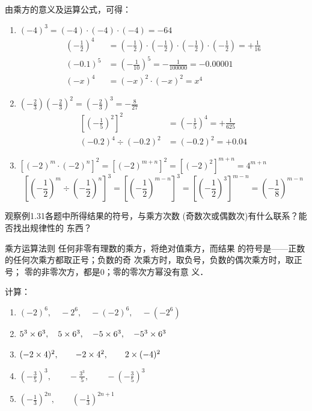 \begin{solution}
	由乘方的意义及运算公式，可得：
	\begin{enumerate}
		\item $(-4)^3=(-4)\cdot (-4)\cdot (-4)=-64$
		\[\begin{split}
		\left(-\frac{1}{2}\right)^4&=\left(-\frac{1}{2}\right)\cdot\left(-\frac{1}{2}\right)\cdot\left(-\frac{1}{2}\right)\cdot\left(-\frac{1}{2}\right)=+\frac{1}{16}\\
		(-0.1)^5&=\left(-\frac{1}{10}\right)^5=-\frac{1}{100000}=-0.00001\\
		(-x)^4&=(-x)^2\cdot (-x)^2=x^4
		\end{split}\]
		\item $\left(-\frac{2}{3}\right)\left(-\frac{2}{3}\right)^2=\left(-\frac{2}{3}\right)^3=-\frac{8}{27}$
		\[\begin{split}
		\left[\left(-\frac{1}{5}\right)^2\right]^2&=\left(-\frac{1}{5}\right)^4=+\frac{1}{625}\\
		(-0.2)^4\div (-0.2)^2&=(-0.2)^2=+0.04
		\end{split}\]
		\item $\left[(-2)^m\cdot (-2)^n\right]^2=[(-2)^{m+n}]^2=[(-2)^2]^{m+n}=4^{m+n}$
		\[\left[\left(-\frac{1}{2}\right)^m\div \left(-\frac{1}{2}\right)^n\right]^3=\left[\left(-\frac{1}{2}\right)^{m-n}\right]^3=\left[\left(-\frac{1}{2}\right)^3\right]^{m-n}=\left(-\frac{1}{8}\right)^{m-n}\]
	\end{enumerate}
\end{solution}

观察例1.31各题中所得结果的符号，与乘方次数
(奇数次或偶数次)有什么联系？能否找出规律性的
东西？

\begin{blk}{乘方运算法则}
	任何非零有理数的乘方，将绝对值乘方，而结果
	的符号是——正数的任何次乘方都取正号；负数的奇
	次乘方时，取负号，负数的偶次乘方时，取正号；
	零的非零次方，都是0；零的零次方幂没有意
	义．
\end{blk}


\begin{example}
	计算：
	\begin{enumerate}
		\item $(-2)^6,\quad -2^6,\quad -(-2)^6,\quad -(-2^6) $
		\item $5^3\times 6^3,\quad 5\times 6^3,\quad -5\times 6^3,\quad -5^3\times 6^3$
		\item $(-2\times 4)^2,\qquad -2\times 4^2,\qquad 2\times (-4)^2$
		\item $\left(-\frac{3}{5}\right)^3,\qquad -\frac{3^3}{5},\qquad -\left(-\frac{3}{5}\right)^3$
		\item $\left(-\frac{1}{3}\right)^{2n},\qquad \left(-\frac{1}{3}\right)^{2n+1}$
	\end{enumerate}
\end{example}


